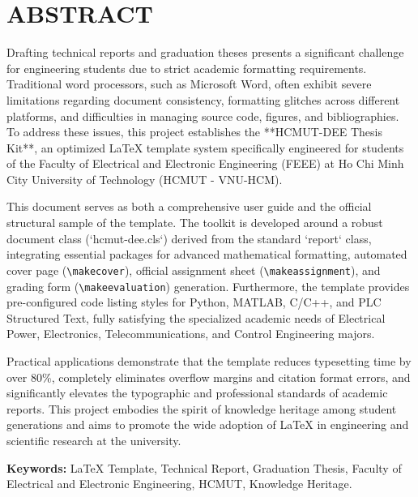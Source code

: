 
\chapter*{ABSTRACT}

Drafting technical reports and graduation theses presents a significant challenge for engineering students due to strict academic formatting requirements. Traditional word processors, such as Microsoft Word, often exhibit severe limitations regarding document consistency, formatting glitches across different platforms, and difficulties in managing source code, figures, and bibliographies. To address these issues, this project establishes the **HCMUT-DEE Thesis Kit**, an optimized LaTeX template system specifically engineered for students of the Faculty of Electrical and Electronic Engineering (FEEE) at Ho Chi Minh City University of Technology (HCMUT - VNU-HCM).

This document serves as both a comprehensive user guide and the official structural sample of the template. The toolkit is developed around a robust document class (`hcmut-dee.cls`) derived from the standard `report` class, integrating essential packages for advanced mathematical formatting, automated cover page (\texttt{\textbackslash makecover}), official assignment sheet (\texttt{\textbackslash makeassignment}), and grading form (\texttt{\textbackslash makeevaluation}) generation. Furthermore, the template provides pre-configured code listing styles for Python, MATLAB, C/C++, and PLC Structured Text, fully satisfying the specialized academic needs of Electrical Power, Electronics, Telecommunications, and Control Engineering majors.

Practical applications demonstrate that the template reduces typesetting time by over 80\%, completely eliminates overflow margins and citation format errors, and significantly elevates the typographic and professional standards of academic reports. This project embodies the spirit of knowledge heritage among student generations and aims to promote the wide adoption of LaTeX in engineering and scientific research at the university.

\vspace{0.5cm}
\noindent \textbf{Keywords:} LaTeX Template, Technical Report, Graduation Thesis, Faculty of Electrical and Electronic Engineering, HCMUT, Knowledge Heritage.
